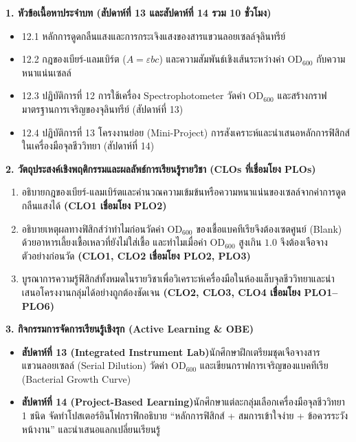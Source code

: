 \cleardoublepage
{}
\begin{planbox}
\noindent\textbf{1. หัวข้อเนื้อหาประจำบท (สัปดาห์ที่ 13 และสัปดาห์ที่ 14 รวม 10 ชั่วโมง)}
\begin{itemize}
    \item 12.1 หลักการดูดกลืนแสงและการกระเจิงแสงของสารแขวนลอยเซลล์จุลินทรีย์
    \item 12.2 กฎของเบียร์-แลมเบิร์ต ($A = \varepsilon b c$) และความสัมพันธ์เชิงเส้นระหว่างค่า $\text{OD}_{600}$ กับความหนาแน่นเซลล์
    \item 12.3 ปฏิบัติการที่ 12 การใช้เครื่อง Spectrophotometer วัดค่า $\text{OD}_{600}$ และสร้างกราฟมาตรฐานการเจริญของจุลินทรีย์ (สัปดาห์ที่ 13)
    \item 12.4 ปฏิบัติการที่ 13 โครงงานย่อย (Mini-Project) การสังเคราะห์และนำเสนอหลักการฟิสิกส์ในเครื่องมือจุลชีววิทยา (สัปดาห์ที่ 14)
\end{itemize}

\noindent\textbf{2. วัตถุประสงค์เชิงพฤติกรรมและผลลัพธ์การเรียนรู้รายวิชา (CLOs ที่เชื่อมโยง PLOs)}
\begin{enumerate}
    \item อธิบายกฎของเบียร์-แลมเบิร์ตและคำนวณความเข้มข้นหรือความหนาแน่นของเซลล์จากค่าการดูดกลืนแสงได้ \textbf{(CLO1 เชื่อมโยง PLO2)}
    \item อธิบายเหตุผลทางฟิสิกส์ว่าทำไมก่อนวัดค่า $\text{OD}_{600}$ ของเชื้อแบคทีเรียจึงต้องเซตศูนย์ (Blank) ด้วยอาหารเลี้ยงเชื้อเหลวที่ยังไม่ใส่เชื้อ และทำไมเมื่อค่า $\text{OD}_{600}$ สูงเกิน $1.0$ จึงต้องเจือจางตัวอย่างก่อนวัด \textbf{(CLO1, CLO2 เชื่อมโยง PLO2, PLO3)}
    \item บูรณาการความรู้ฟิสิกส์ทั้งหมดในรายวิชาเพื่อวิเคราะห์เครื่องมือในห้องแล็บจุลชีววิทยาและนำเสนอโครงงานกลุ่มได้อย่างถูกต้องชัดเจน \textbf{(CLO2, CLO3, CLO4 เชื่อมโยง PLO1--PLO6)}
\end{enumerate}

\noindent\textbf{3. กิจกรรมการจัดการเรียนรู้เชิงรุก (Active Learning \& OBE)}
\begin{itemize}
    \item \textbf{สัปดาห์ที่ 13 (Integrated Instrument Lab)}\quad นักศึกษาฝึกเตรียมชุดเจือจางสารแขวนลอยเซลล์ (Serial Dilution) วัดค่า $\text{OD}_{600}$ และเขียนกราฟการเจริญของแบคทีเรีย (Bacterial Growth Curve)
    \item \textbf{สัปดาห์ที่ 14 (Project-Based Learning)}\quad นักศึกษาแต่ละกลุ่มเลือกเครื่องมือจุลชีววิทยา 1 ชนิด จัดทำโปสเตอร์อินโฟกราฟิกอธิบาย ``หลักการฟิสิกส์ + สมการเข้าใจง่าย + ข้อควรระวังหน้างาน'' และนำเสนอแลกเปลี่ยนเรียนรู้
\end{itemize}


\end{planbox}
